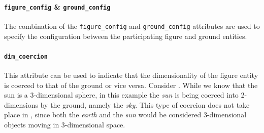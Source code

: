 \documentclass[11pt]{article}
\begin{document}
\paragraph{\texttt{figure\_config} \& \texttt{ground\_config}} %
\label{par:figure_ground_config}
The combination of the \texttt{figure\_config} and \texttt{ground\_config} attributes are used to specify the configuration between the participating figure and ground entities. 

\label{ex:ground_requirement}


\paragraph{\texttt{dim\_coercion}} %
\label{par:dim_coercion}

This attribute can be used to indicate that the dimensionality of the figure entity is coerced to that of the ground or vice versa. Consider . While we know that the sun is a 3-dimensional sphere, in this example the \emph{sun} is being coerced into 2-dimensions by the ground, namely the \emph{sky}. This type of coercion does not take place in , since both the \emph{earth} and the \emph{sun} would be considered 3-dimensional objects moving in 3-dimensional space.

\label{ex:coercion}
\end{document}
